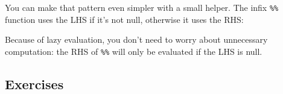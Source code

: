 \documentclass[]{book}
\newenvironment{Shaded}{\begin{snugshade}}{\end{snugshade}}
\newcommand{\KeywordTok}[1]{\textcolor[rgb]{0.13,0.29,0.53}{\textbf{#1}}}
\newcommand{\DataTypeTok}[1]{\textcolor[rgb]{0.13,0.29,0.53}{#1}}
\newcommand{\StringTok}[1]{\textcolor[rgb]{0.31,0.60,0.02}{#1}}
\newcommand{\OtherTok}[1]{\textcolor[rgb]{0.56,0.35,0.01}{#1}}
\newcommand{\ControlFlowTok}[1]{\textcolor[rgb]{0.13,0.29,0.53}{\textbf{#1}}}
\newcommand{\OperatorTok}[1]{\textcolor[rgb]{0.81,0.36,0.00}{\textbf{#1}}}
\newcommand{\NormalTok}[1]{#1}
\theoremstyle{definition}
\theoremstyle{definition}
\theoremstyle{definition}
\theoremstyle{remark}
\begin{document}
You can make that pattern even simpler with a small helper. The infix
\texttt{\%\textbar{}\textbar{}\%} function uses the LHS if it's not
null, otherwise it uses the RHS:

\begin{Shaded}
\end{Shaded}

Because of lazy evaluation, you don't need to worry about unnecessary
computation: the RHS of \texttt{\%\textbar{}\textbar{}\%} will only be
evaluated if the LHS is null.

\subsection{Exercises}\label{exercises-2}
\end{document}
